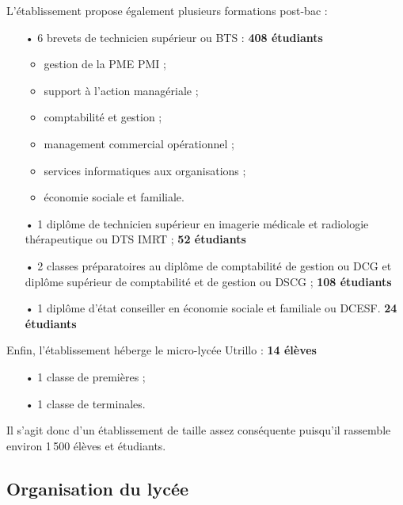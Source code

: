 \documentclass[12pt,a4paper]{article}
\begin{document}
L'établissement propose également plusieurs formations post-bac :
\begin{itemize}
\item[•] 6 brevets de technicien supérieur ou BTS : \hfill \textbf{408 étudiants}
\begin{itemize}
\item gestion de la PME PMI ;
\item support à l'action managériale ;
\item comptabilité et gestion ;
\item management commercial opérationnel ;
\item services informatiques aux organisations ;
\item économie sociale et familiale.
\end{itemize}
\item[•] 1 diplôme de technicien supérieur en imagerie médicale et radiologie thérapeutique ou DTS IMRT ; \hfill \textbf{52 étudiants}
\item[•] 2 classes préparatoires au diplôme de comptabilité de gestion ou DCG et diplôme supérieur de comptabilité et de gestion ou DSCG ; \hfill \textbf{108 étudiants}
\item[•] 1 diplôme d'état conseiller en économie sociale et familiale ou DCESF. \hfill \textbf{24 étudiants}
\end{itemize}

Enfin, l'établissement héberge le micro-lycée Utrillo : \hfill \textbf{14 élèves}
\begin{itemize}
\item[•] 1 classe de premières ;
\item[•] 1 classe de terminales.
\end{itemize}

Il s'agit donc d'un établissement de taille assez conséquente puisqu'il rassemble environ 1\,500 élèves et étudiants.

\subsection{Organisation du lycée}
\end{document}
